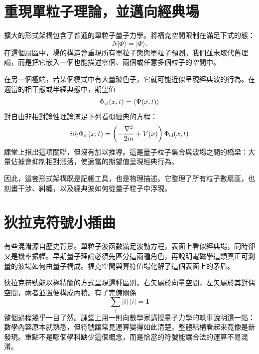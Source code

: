 \section{重現單粒子理論，並邁向經典場}

擴大的形式架構包含了普通的單粒子量子力學。將福克空間限制在滿足下式的態：
\begin{equation}
N|\Phi\rangle=|\Phi\rangle.
\end{equation}
在這個扇區中，場的構造會重現所有單粒子態與單粒子預測。我們並未取代舊理論，而是把它嵌入一個也能描述零個、兩個或任意多個粒子的空間中。

在另一個極端，若某個模式中有大量玻色子，它就可能近似呈現經典波的行為。在適當的相干態或半經典態中，期望值
\begin{equation}
\Phi_{\rm cl}(x,t)=\langle\Psi(x,t)\rangle
\end{equation}
對自由非相對論性理論滿足下列看似經典的方程：
\begin{equation}
i\partial_t\Phi_{\rm cl}(x,t)
=\left(-\frac{\nabla^2}{2m}+V(x)\right)\Phi_{\rm cl}(x,t)
\label{eq:l07-classical-schrodinger}
\end{equation}
課堂上指出這項關聯，但沒有加以推導。這是量子粒子集合與波場之間的橋梁：大量佔據會抑制相對漲落，使適當的期望值呈現經典行為。

因此，這套形式架構既是記帳工具，也是物理描述。它整理了所有粒子數扇區，也刻畫干涉、糾纏，以及經典波如何從量子粒子中浮現。

\begin{classroomqa}
\end{classroomqa}

\section{狄拉克符號小插曲}

有些混淆源自歷史背景。單粒子波函數滿足波動方程，表面上看似經典場，同時卻又是機率振幅。早期量子理論必須先區分這兩種角色，再說明電磁學這類真正可測量的波場如何由量子構成。福克空間與算符值場化解了這個表面上的矛盾。

狄拉克符號能以極精簡的方式呈現這種區別。右矢屬於向量空間，左矢屬於其對偶空間，兩者並置便構成內積。有了完備關係
\begin{equation}
\sum_i|i\rangle\langle i|=\mathbf 1
\end{equation}
整個過程幾乎一目了然。課堂上用一則向數學家講授量子力學的軼事說明這一點：數學內容原本就熟悉，但符號讓常見運算變得如此清楚，整體結構看起來竟像是新發現。重點不是哪個學科缺少這個概念，而是恰當的符號能讓合法的運算不易混淆。

